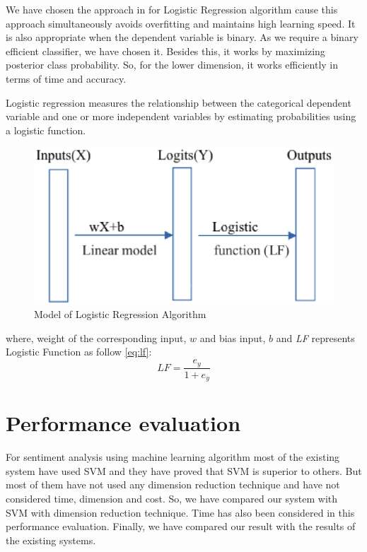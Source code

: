 \documentclass[10pt, conference]{IEEEtran}
\begin{document}
	We have chosen the approach in \cite{b20} for Logistic Regression algorithm cause this approach simultaneously avoids overfitting and maintains high learning speed. It is also appropriate when the dependent variable is binary. As we require a binary efficient classifier, we have chosen it. Besides this, it works by maximizing posterior class probability. So, for the lower dimension, it works efficiently in terms of time and accuracy.
	
	Logistic regression measures the relationship between the categorical dependent variable and one or more independent variables by estimating probabilities using a logistic function.
	
	\begin{figure}[H]
		\includegraphics[width = 0.35\textheight]{logisticRegression.eps}
		\caption{Model of Logistic Regression Algorithm}
		\label{fig:train}
	\end{figure}
	where, weight of the corresponding input, $w$ and bias input, $b$ and \textit{LF} represents Logistic Function as follow \eqref{eq:lf}:
	\begin{equation}
		LF = \dfrac{e_y}{1 + e_y}
		\label{eq:lf}
	\end{equation}
	
	\section{Performance evaluation}
	
	For sentiment analysis using machine learning algorithm most of the existing system have used SVM and they have proved that SVM is superior to others. But most of them have not used any dimension reduction technique and have not considered time, dimension and cost. So, we have compared our system with SVM with dimension reduction technique. Time has also been considered in this performance evaluation. Finally, we have compared our result with the results of the existing systems.
	
\end{document}
